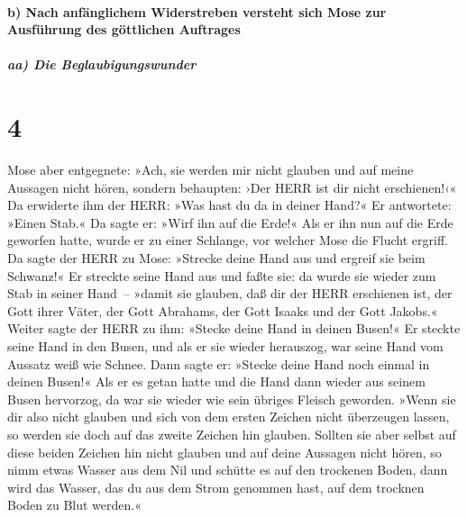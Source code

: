 \hypertarget{b-nach-anfuxe4nglichem-widerstreben-versteht-sich-mose-zur-ausfuxfchrung-des-guxf6ttlichen-auftrages}{%
\paragraph{b) Nach anfänglichem Widerstreben versteht sich Mose zur
Ausführung des göttlichen
Auftrages}\label{b-nach-anfuxe4nglichem-widerstreben-versteht-sich-mose-zur-ausfuxfchrung-des-guxf6ttlichen-auftrages}}

\hypertarget{aa-die-beglaubigungswunder}{%
\subparagraph{aa) Die
Beglaubigungswunder}\label{aa-die-beglaubigungswunder}}

\hypertarget{section-3}{%
\section{4}\label{section-3}}

 Mose aber entgegnete: »Ach, sie werden mir nicht glauben
und auf meine Aussagen nicht hören, sondern behaupten: ›Der HERR ist dir
nicht erschienen!‹«  Da erwiderte ihm der HERR: »Was hast
du da in deiner Hand?« Er antwortete: »Einen Stab.«  Da
sagte er: »Wirf ihn auf die Erde!« Als er ihn nun auf die Erde geworfen
hatte, wurde er zu einer Schlange, vor welcher Mose die Flucht ergriff.
 Da sagte der HERR zu Mose: »Strecke deine Hand aus und
ergreif sie beim Schwanz!« Er streckte seine Hand aus und faßte sie: da
wurde sie wieder zum Stab in seiner Hand~--  »damit sie
glauben, daß dir der HERR erschienen ist, der Gott ihrer Väter, der Gott
Abrahams, der Gott Isaaks und der Gott Jakobs.«  Weiter
sagte der HERR zu ihm: »Stecke deine Hand in deinen Busen!« Er steckte
seine Hand in den Busen, und als er sie wieder herauszog, war seine Hand
vom Aussatz weiß wie Schnee.  Dann sagte er: »Stecke deine
Hand noch einmal in deinen Busen!« Als er es getan hatte und die Hand
dann wieder aus seinem Busen hervorzog, da war sie wieder wie sein
übriges Fleisch geworden.  »Wenn sie dir also nicht
glauben und sich von dem ersten Zeichen nicht überzeugen lassen, so
werden sie doch auf das zweite Zeichen hin glauben. 
Sollten sie aber selbst auf diese beiden Zeichen hin nicht glauben und
auf deine Aussagen nicht hören, so nimm etwas Wasser aus dem Nil und
schütte es auf den trockenen Boden, dann wird das Wasser, das du aus dem
Strom genommen hast, auf dem trocknen Boden zu Blut werden.«

